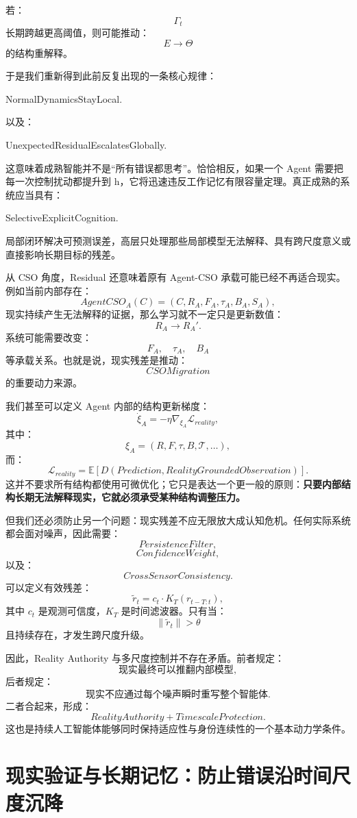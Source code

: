 若：
\[
\Gamma_t
\]
长期跨越更高阈值，则可能推动：
\[
E\rightarrow\Theta
\]
的结构重解释。

于是我们重新得到此前反复出现的一条核心规律：
\begin{statementbox}
NormalDynamicsStayLocal.
\end{statementbox}
以及：
\begin{statementbox}
UnexpectedResidualEscalatesGlobally.
\end{statementbox}

这意味着成熟智能并不是``所有错误都思考''。恰恰相反，如果一个 Agent 需要把每一次控制扰动都提升到 h，它将迅速违反工作记忆有限容量定理。真正成熟的系统应当具有：
\begin{statementbox}
SelectiveExplicitCognition.
\end{statementbox}
局部闭环解决可预测误差，高层只处理那些局部模型无法解释、具有跨尺度意义或直接影响长期目标的残差。

从 CSO 角度，Residual 还意味着原有 Agent-CSO 承载可能已经不再适合现实。例如当前内部存在：
\[
AgentCSO_A(C)
=
(C,R_A,F_A,\tau_A,B_A,S_A),
\]
现实持续产生无法解释的证据，那么学习就不一定只是更新数值：
\[
R_A\rightarrow R_A'.
\]
系统可能需要改变：
\[
F_A,\quad \tau_A,\quad B_A
\]
等承载关系。也就是说，现实残差是推动：
\[
CSOMigration
\]
的重要动力来源。

我们甚至可以定义 Agent 内部的结构更新梯度：
\[
\dot{\xi}_A
=
-\eta
\nabla_{\xi_A}
\mathcal L_{reality},
\]
其中：
\[
\xi_A
=
(R,F,\tau,B,\mathcal T,\ldots),
\]
而：
\[
\mathcal L_{reality}
=
\mathbb E
\left[
D(
Prediction,
RealityGroundedObservation
)
\right].
\]
这并不要求所有结构都使用可微优化；它只是表达一个更一般的原则：\textbf{只要内部结构长期无法解释现实，它就必须承受某种结构调整压力。}

但我们还必须防止另一个问题：现实残差不应无限放大成认知危机。任何实际系统都会面对噪声，因此需要：
\[
PersistenceFilter,
\]
\[
ConfidenceWeight,
\]
以及：
\[
CrossSensorConsistency.
\]
可以定义有效残差：
\[
\tilde r_t
=
c_t
\cdot
K_T(r_{t-T:t}),
\]
其中 $c_t$ 是观测可信度，$K_T$ 是时间滤波器。只有当：
\[
\|\tilde r_t\|>\theta
\]
且持续存在，才发生跨尺度升级。

因此，Reality Authority 与多尺度控制并不存在矛盾。前者规定：
\[
\text{现实最终可以推翻内部模型},
\]
后者规定：
\[
\text{现实不应通过每个噪声瞬时重写整个智能体}.
\]
二者合起来，形成：
\[
\boxed{
RealityAuthority
+
TimescaleProtection.
}
\]
这也是持续人工智能体能够同时保持适应性与身份连续性的一个基本动力学条件。

\section{现实验证与长期记忆：防止错误沿时间尺度沉降}

